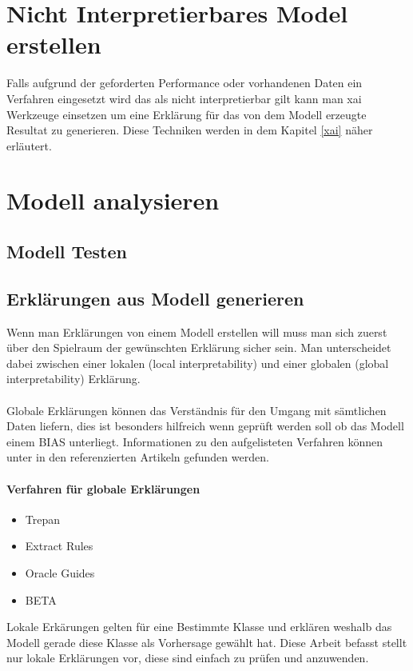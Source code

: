 \documentclass[
  12pt, %
  a4paper, %
  oneside, %
  openany, 
  numbers=noenddot, %
  BCOR=5mm, %
  parskip=half*, %
  thesis, %
]{bfhbook}
\begin{document}
\section{Nicht Interpretierbares Model erstellen}
Falls aufgrund der geforderten Performance oder vorhandenen Daten ein Verfahren eingesetzt wird das als nicht interpretierbar gilt kann man \Gls{xai} Werkzeuge einsetzen um eine Erklärung für das von dem Modell erzeugte Resultat zu generieren. Diese Techniken werden in dem Kapitel \ref{xai} näher erläutert.

\section{Modell analysieren}

\subsection{Modell Testen}

\subsection{Erklärungen aus Modell generieren}
Wenn man Erklärungen von einem Modell erstellen will muss man sich zuerst über den Spielraum der gewünschten Erklärung sicher sein. Man unterscheidet dabei zwischen einer lokalen (local interpretability) und einer globalen (global interpretability) Erklärung.
\\\\
Globale Erklärungen können das Verständnis für den Umgang mit sämtlichen Daten liefern, dies ist besonders hilfreich wenn geprüft werden soll ob das Modell einem \Gls{BIAS} unterliegt. Informationen zu den aufgelisteten Verfahren können unter in den referenzierten Artikeln gefunden werden.

\paragraph*{Verfahren für globale Erklärungen}
\begin{itemize}
	\item Trepan \parencite{10.5555/2998828.2998832}
	\item Extract Rules \parencite{Craven1994}
	\item Oracle Guides \parencite{Johansson2009}
	\item BETA \parencite{Lakkaraju2017}
\end{itemize}

Lokale Erkärungen gelten für eine Bestimmte Klasse und erklären weshalb das Modell gerade diese Klasse als Vorhersage gewählt hat. Diese Arbeit befasst stellt nur lokale Erklärungen vor, diese sind einfach zu prüfen und anzuwenden.
\\
\end{document}
